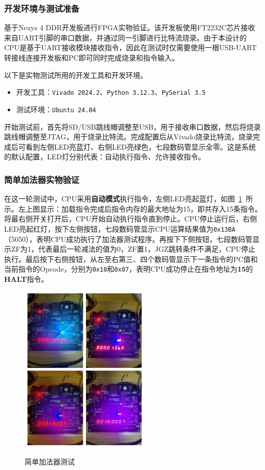 \documentclass[lang=cn,a4paper,newtx]{elegantpaper}
\begin{document}
\subsubsection{开发环境与测试准备}
基于Nexys 4 DDR开发板进行FPGA实物验证。该开发板使用FT2232C芯片接收来自UART引脚的串口数据，并通过同一引脚进行比特流烧录。由于本设计的CPU是基于UART接收模块接收指令，因此在测试时仅需要使用一根USB-UART转接线连接开发板和PC即可同时完成烧录和指令输入。

以下是实物测试所用的开发工具和开发环境。
\begin{itemize}
  \item 开发工具：\texttt{Vivado 2024.2}、\texttt{Python 3.12.3}、\texttt{PySerial 3.5}
  \item 测试环境：\texttt{Ubuntu 24.04}
\end{itemize}


开始测试前，首先将SD/USB跳线帽调整至USB，用于接收串口数据，然后将烧录跳线帽调整至JTAG，用于烧录比特流。完成配置后从Vivado烧录比特流，烧录完成后可看到左侧LED亮蓝灯、右侧LED亮绿色，七段数码管显示全零。这是系统的默认配置，LED灯分别代表：自动执行指令、允许接收指令。
\subsubsection{简单加法器实物验证}

在这一轮测试中，CPU采用\textbf{自动模式}执行指令，左侧LED亮起蓝灯，如图~\ref{fig:FPGA_add}~所示。左上图显示：加载指令完成后指令内存的最大地址为15，即共存入15条指令。将最右侧开关打开后，CPU开始自动执行指令直到停止。CPU停止运行后，右侧LED亮起红灯，按下左侧按钮，七段数码管显示CPU运算结果值为\texttt{0x13BA}（5050），表明CPU成功执行了加法器测试程序。再按下下侧按钮，七段数码管显示ZF为1，代表最后一轮减法的值为0，ZF置1，JGZ跳转条件不满足，CPU停止执行。最后按下右侧按钮，从左至右第三、四个数码管显示下一条指令的PC值和当前指令的Opcode，分别为\texttt{0x10}和\texttt{0x07}，表明CPU成功停止在指令地址为\textbf{15}的\textbf{HALT}指令。
\begin{figure}[htbp]
  \centering
  \caption{简单加法器测试}
  \includegraphics[width = 0.55\textwidth]{figure/add_verification.pdf}
  \label{fig:FPGA_add}
\end{figure}
\end{document}
